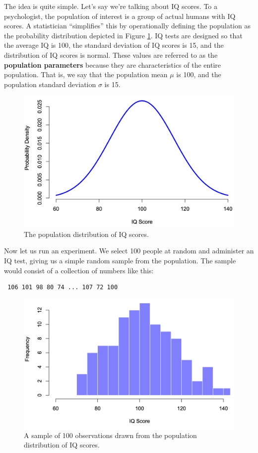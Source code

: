 \documentclass[
  11pt,
  a4paper,
  twoside,symmetric,openright]{book}
\theoremstyle{break}
\theoremstyle{break}
\begin{document}
The idea is quite simple. Let's say we're talking about IQ scores. To a psychologist, the population of interest is a group of actual humans with IQ scores. A statistician ``simplifies'' this by operationally defining the population as the probability distribution depicted in Figure \ref{fig:IQdista}. IQ tests are designed so that the average IQ is 100, the standard deviation of IQ scores is 15, and the distribution of IQ scores is normal. These values are referred to as the \textbf{population parameters} because they are characteristics of the entire population. That is, we say that the population mean \(\mu\) is 100, and the population standard deviation \(\sigma\) is 15.

\begin{figure}

{\centering \includegraphics[width=0.6\linewidth]{resources/image/IQdista} 

}

\caption{The population distribution of IQ scores.}\label{fig:IQdista}
\end{figure}

Now let us run an experiment. We select 100 people at random and administer an IQ test, giving us a simple random sample from the population. The sample would consist of a collection of numbers like this:

\begin{verbatim}
 106 101 98 80 74 ... 107 72 100
\end{verbatim}

\begin{figure}

{\centering \includegraphics[width=0.6\linewidth]{resources/image/IQdistb} 

}

\caption{A sample of 100 observations drawn from the population distribution of IQ scores.}\label{fig:IQdistb}
\end{figure}
\end{document}
